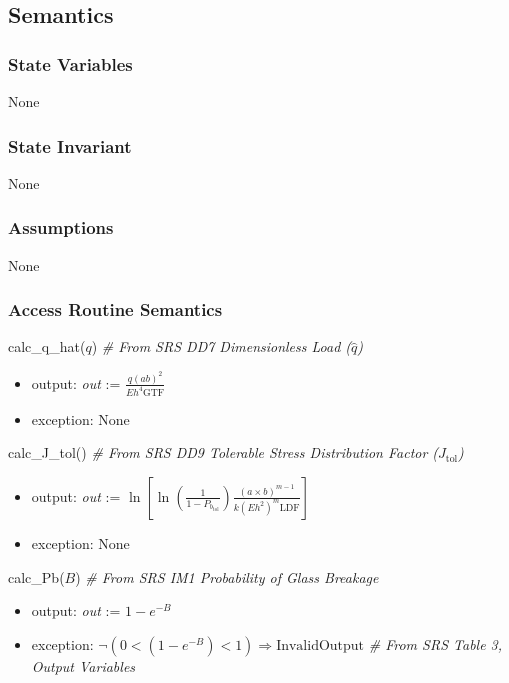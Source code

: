 \documentclass[12pt, titlepage]{article}
\begin{document}
\subsection {Semantics}

\subsubsection {State Variables}

None

\subsubsection {State Invariant}

None

\subsubsection {Assumptions}

None

\subsubsection {Access Routine Semantics}

\noindent calc\_q\_hat($q$) \textit{\# From SRS DD7 Dimensionless Load ($\hat{q}$)}
\begin{itemize}
\item output:  \textit{out} := $\frac{q(ab)^2}{Eh^4\text{GTF}}$
\item exception: None
\end{itemize}

\noindent calc\_J\_tol() \textit{\# From SRS DD9 Tolerable Stress Distribution Factor ($J_\text{tol}$)}
\begin{itemize}
\item output:  \textit{out} := $\ln[\ln( \frac{1}{1-P_{b_{\text{tol}}}} )
				\frac{(a \times b)^{m-1}}
					{k(E h^2)^m \text{LDF} }]$
\item exception: None
\end{itemize}

\noindent calc\_Pb($B$) \textit{\# From SRS IM1 Probability of Glass Breakage}
\begin{itemize}
\item output:  \textit{out} := $1-e^{-B}$
\item exception: $\neg(0 < (1-e^{-B}) < 1) \Rightarrow
  \mbox{InvalidOutput}$ \textit{\# From SRS Table 3, Output Variables}
\end{itemize}
\end{document}
